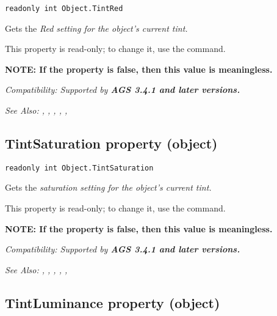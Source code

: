 \begin{verbatim}
readonly int Object.TintRed
\end{verbatim}
Gets the \it{Red} setting for the object's current tint.

This property is read-only; to change it, use the  command.

\bf{NOTE:} If the  property is false, then
this value is meaningless.

\it{Compatibility:} Supported by \bf{AGS 3.4.1} and later versions.

\it{See Also:} , ,
, ,
, 


\subsection{TintSaturation property (object)}\label{Object.TintSaturation}%

\begin{verbatim}
readonly int Object.TintSaturation
\end{verbatim}
Gets the \it{saturation} setting for the object's current tint.

This property is read-only; to change it, use the  command.

\bf{NOTE:} If the  property is false, then
this value is meaningless.

\it{Compatibility:} Supported by \bf{AGS 3.4.1} and later versions.

\it{See Also:} , ,
, ,
, 


\subsection{TintLuminance property (object)}\label{Object.TintLuminance}%

